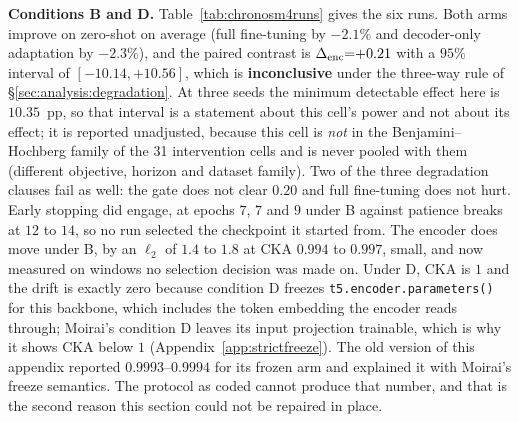 \begin{table}[ht]
\centering
\caption{\textbf{Conditions B and D on Chronos/M4-Monthly}, $n{=}500$ training
windows, lr $10^{-5}$, batch $32$, $20$ epochs with patience $5$, early stopping
on the selection windows and best epoch ${\geq}1$.  Forgetting is \% change in
held-out MSE against the same seed's zero-shot measurement (\emph{negative is
better than zero-shot}); $\denc$ is the paired difference.  CKA is the linear CKA
of the mean-pooled final encoder output on the $200$ selection contexts, and the
$\ell_2$ column is the encoder state dict's distance from pre-trained.  Under
condition D both are fixed \emph{by construction} and not by measurement: on
Chronos, freezing the encoder freezes the shared token embedding with it.}
\label{tab:chronosm4runs}

\end{table}

\textbf{Conditions B and D.}
Table~\ref{tab:chronosm4runs} gives the six runs.  Both arms improve on
zero-shot on average (full fine-tuning by $-2.1\%$ and decoder-only
adaptation by $-2.3\%$), and the paired contrast is
$\Delta_\text{enc}{=}{+}0.21$ with a $95\%$ interval of $[-10.14, +10.56]$, which is
\textbf{inconclusive} under the three-way rule of \S\ref{sec:analysis:degradation}.
At three seeds the minimum detectable effect here is $10.35$~pp, so that
interval is a statement about this cell's power and not about its effect; it is
reported unadjusted, because this cell is \emph{not} in the Benjamini--Hochberg
family of the 31 intervention cells and is never pooled with them (different
objective, horizon and dataset family).  Two of the three degradation clauses
fail as well: the gate does not clear $0.20$ and full fine-tuning does not hurt.
Early stopping did engage, at epochs $7$, $7$ and $9$ under B against patience
breaks at $12$ to $14$, so no run selected the checkpoint it started from.  The
encoder does move under B, by an $\ell_2$ of $1.4$ to $1.8$ at CKA
$0.994$ to $0.997$, small, and now measured on windows no selection decision
was made on.  Under D, CKA is $1$ and the drift is exactly zero because
condition D freezes \texttt{t5.encoder.parameters()} for this backbone, which
includes the token embedding the encoder reads through; Moirai's condition D
leaves its input projection trainable, which is why it shows CKA below $1$
(Appendix~\ref{app:strictfreeze}).  The old version of this appendix reported
$0.9993$--$0.9994$ for its frozen arm and explained it with Moirai's freeze
semantics.  The protocol as coded cannot produce that number, and that is the
second reason this section could not be repaired in place.

